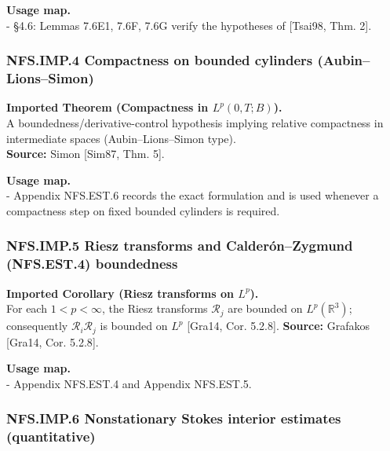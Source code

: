 \documentclass[
  11pt,
]{article}
\begin{document}
\textbf{Usage map.}\\
- §4.6: Lemmas 7.6E1, 7.6F, 7.6G verify the hypotheses of {[}Tsai98, Thm. 2{]}.

\hypertarget{nfs.imp.4-compactness-on-bounded-cylinders-aubinlionssimon}{%
\subsubsection{NFS.IMP.4 Compactness on bounded cylinders (Aubin--Lions--Simon)}\label{nfs.imp.4-compactness-on-bounded-cylinders-aubinlionssimon}}

\textbf{Imported Theorem (Compactness in \(L^p(0,T;B)\)).}\\
A boundedness/derivative-control hypothesis implying relative compactness in intermediate spaces (Aubin--Lions--Simon type).\\
\textbf{Source:} Simon {[}Sim87, Thm. 5{]}.

\textbf{Usage map.}\\
- Appendix NFS.EST.6 records the exact formulation and is used whenever a compactness step on fixed bounded cylinders is required.

\hypertarget{nfs.imp.5-riesz-transforms-and-calderuxf3nzygmund-nfs.est.4-boundedness}{%
\subsubsection{NFS.IMP.5 Riesz transforms and Calderón--Zygmund (NFS.EST.4) boundedness}\label{nfs.imp.5-riesz-transforms-and-calderuxf3nzygmund-nfs.est.4-boundedness}}

\textbf{Imported Corollary (Riesz transforms on \(L^p\)).}\\
For each \(1<p<\infty\), the Riesz transforms \(\mathcal R_j\) are bounded on \(L^p(\mathbb R^3)\); consequently \(\mathcal R_i\mathcal R_j\) is bounded on \(L^p\) {[}Gra14, Cor. 5.2.8{]}. \textbf{Source:} Grafakos {[}Gra14, Cor. 5.2.8{]}.

\textbf{Usage map.}\\
- Appendix NFS.EST.4 and Appendix NFS.EST.5.

\hypertarget{nfs.imp.6-nonstationary-stokes-interior-estimates-quantitative}{%
\subsubsection{NFS.IMP.6 Nonstationary Stokes interior estimates (quantitative)}\label{nfs.imp.6-nonstationary-stokes-interior-estimates-quantitative}}
\end{document}
